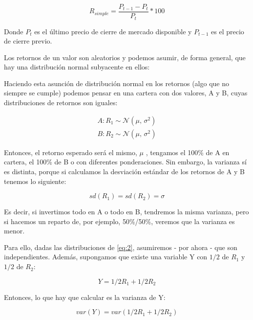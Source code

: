 \begin{equation}
	R_{simple} = \frac{P_{t-1} - P_{t}}{P_{t}} * 100
\end{equation}

Donde $P_{t}$ es el último precio de cierre de mercado disponible y $P_{t-1}$ es el precio de cierre previo. 

Los retornos de un valor son aleatorios y podemos asumir, de forma general, que hay una distribución normal subyacente en ellos:


Haciendo esta asunción de distribución normal en los retornos (algo que no siempre se cumple) podemos pensar en una cartera con dos valores, A y B, cuyas distribuciones de retornos son iguales: 

\begin{align} \label{eq:2}
	A: R_{1} \sim  \mathcal{N}(\mu,\,\sigma^{2})\\ 
	B: R_{2} \sim  \mathcal{N}(\mu,\,\sigma^{2})
\end{align}

Entonces, el retorno esperado será el mismo, $\mu$ , tengamos el 100\% de A en cartera, el 100\% de B o con diferentes ponderaciones. Sin embargo, la varianza sí es distinta, porque si calculamos la desviación estándar de los retornos de A y B tenemos lo siguiente: 

\begin{equation}
	sd(R_{1}) = sd(R_{2}) = \sigma
\end{equation}

Es decir, si invertimos todo en A o todo en B, tendremos la misma varianza, pero si hacemos un reparto de, por ejemplo, 50\%/50\%, veremos que la varianza es menor. 

Para ello, dadas las distribuciones de \ref{eq:2}, asumiremos - por ahora - que son independientes. Además, supongamos que existe una variable Y con $1/2$ de $R_{1}$ y $1/2$ de $R_{2}$:

\begin{equation}
	Y = 1/2R_{1} + 1/2R_{2}
\end{equation} 

Entonces, lo que hay que calcular es la varianza de Y:

\begin{equation}
	var(Y) = var(1/2R_{1} + 1/2R_{2})
\end{equation}


